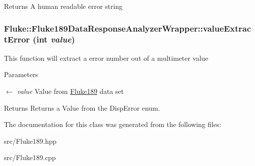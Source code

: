 \begin{DoxyReturn}{Returns}
A human readable error string 
\end{DoxyReturn}
\hypertarget{classFluke_1_1Fluke189DataResponseAnalyzerWrapper_ab12ae68ca8c80dce4a952811825de465}{
\subsubsection[{valueExtractError}]{ Fluke::Fluke189DataResponseAnalyzerWrapper::valueExtractError (int {\em value})}}
\label{classFluke_1_1Fluke189DataResponseAnalyzerWrapper_ab12ae68ca8c80dce4a952811825de465}
This function will extract a error number out of a multimeter value 
\begin{DoxyParams}{Parameters}
\item[\mbox{$\leftarrow$} {\em value}]Value from \hyperlink{classFluke_1_1Fluke189}{Fluke189} data set \end{DoxyParams}
\begin{DoxyReturn}{Returns}
Returns a Value from the DispError enum. 
\end{DoxyReturn}


The documentation for this class was generated from the following files:\begin{DoxyCompactItemize}
\item 
src/Fluke189.hpp\item 
src/Fluke189.cpp\end{DoxyCompactItemize}
